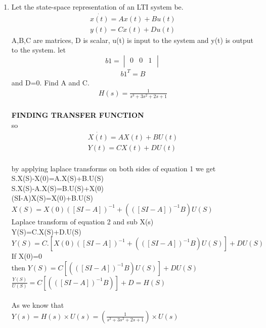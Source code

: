 \begin{enumerate}[label=\thesection.\arabic*.,ref=\thesection.\theenumi]
\item Let the state-space representation of an LTI system be.
\begin{align*}
 \dot{x(t)}=Ax(t)+Bu(t) \\
 y(t)=Cx(t)+Du(t)
\end{align*}
A,B,C are matrices, D is scalar, u(t) is input to the system and y(t) is output to the system. let
\begin{equation}
 b1 =\begin{vmatrix}
  0&0&1\\
 \end{vmatrix}
\end{equation}
\begin{align}
b1^T=B
\end{align}
and D=0. Find A and C.
\begin{align}
H(s)=\frac{1}{s^3+3s^2+2s+1}
\end{align}
\solution
\\ \textbf{FINDING TRANSFER FUNCTION}
\\so
\begin{align*}
 \dot{X(t)}=AX(t)+BU(t) \\
 Y(t)=CX(t)+DU(t)
\end{align*}    
\\by applying laplace transforms on both sides of equation 1
we get
\\S.X(S)-X(0)=A.X(S)+B.U(S)
\\S.X(S)-A.X(S)=B.U(S)+X(0)
\\(SI-A)X(S)=X(0)+B.U(S)
\\$X(S)=X(0)([SI-A])^{-1}+(([SI-A])^{-1}B)U(S)$
\\Laplace transform of equation 2 and sub X(s) 
\\Y(S)=C.X(S)+D.U(S)
\\$Y(S)=C.[X(0)([SI-A])^{-1 }+ (([SI-A])^{-1}B)U(S)]+DU(S)$
\\If X(0)=0
\\then $Y(S)=C[(([SI-A])^{-1}B)U(S)]+DU(S)$
\\$\frac{Y(S)}{U(S)}=C[(([SI-A])^{-1}B)]+D=H(S)$
\\
\\ As we know that
\\ $Y(s)=H(s) \times U(s)= (\frac{1}{s^3+3s^2+2s+1}) \times U(s) $

\end{enumerate}
